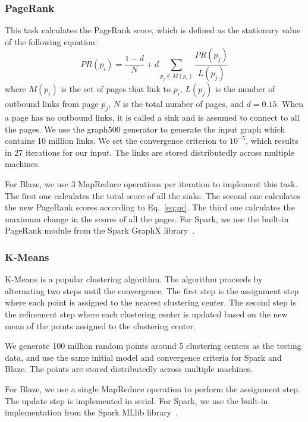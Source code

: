 \subsubsection{PageRank}

This task calculates the PageRank score, which is defined as the stationary value of the following equation:
\begin{equation}
    \label{eq:pr}
    PR(p_i) = \frac{1-d}{N} + d \sum_{p_j\in M(p_i)} \frac{PR(p_j)}{L(p_j)}
\end{equation}
where $M(p_i)$ is the set of pages that link to $p_i$, $L(p_j)$ is the number of outbound links from page $p_j$, $N$ is the total number of pages, and $d=0.15$.
When a page has no outbound links, it is called a sink and is assumed to connect to all the pages.
We use the graph500 generator to generate the input graph which contains 10 million links.
We set the convergence criterion to $10^{-5}$, which results in 27 iterations for our input.
The links are stored distributedly across multiple machines.

For Blaze, we use 3 MapReduce operations per iteration to implement this task.
The first one calculates the total score of all the sinks.
The second one calculates the new PageRank scores according to Eq.~\ref{eq:pr}.
The third one calculates the maximum change in the scores of all the pages.
For Spark, we use the built-in PageRank module from the Spark GraphX library~\cite{xin2013graphx}.

\subsubsection{K-Means}

K-Means is a popular clustering algorithm.
The algorithm proceeds by alternating two steps until the convergence.
The first step is the assignment step where each point is assigned to the nearest clustering center.
The second step is the refinement step where each clustering center is updated based on the new mean of the points assigned to the clustering center.

We generate 100 million random points around 5 clustering centers as the testing data, and use the same initial model and convergence criteria for Spark and Blaze.
The points are stored distributedly across multiple machines.

For Blaze, we use a single MapReduce operation to perform the assignment step.
The update step is implemented in serial.
For Spark, we use the built-in implementation from the Spark MLlib library~\cite{meng2016mllib}.

